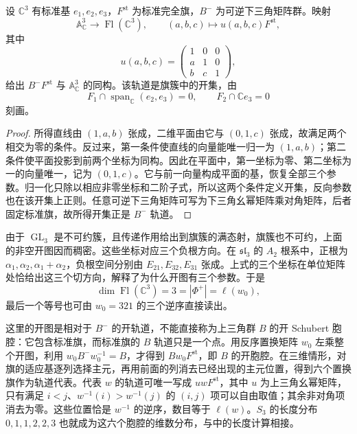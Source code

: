 \begin{proposition}\label{b5:prop:three-dimensional-flag-chart}
	设 \(\mathbb C^3\) 有标准基 \(e_1,e_2,e_3\)，\(F^{\mathrm{st}}\) 为标准完全旗，\(B^-\) 为可逆下三角矩阵群。映射
	\[
		\mathbb A^3_{\mathbb C}\longrightarrow\operatorname{Fl}(\mathbb C^3), \qquad (a,b,c)\longmapsto u(a,b,c)F^{\mathrm{st}},
	\]
	其中
	\[
		u(a,b,c)=\begin{pmatrix}1&0&0\\a&1&0\\b&c&1\end{pmatrix},
	\]
	给出 \(B^-F^{\mathrm{st}}\) 与 \(\mathbb A^3_{\mathbb C}\) 的同构。该轨道是旗簇中的开集，由
	\[
		F_1\cap\operatorname{span}_{\mathbb C}(e_2,e_3)=0, \qquad F_2\cap\mathbb Ce_3=0
	\]
	刻画。
\end{proposition}
\begin{proof}
	所得直线由 \((1,a,b)\) 张成，二维平面由它与 \((0,1,c)\) 张成，故满足两个相交为零的条件。反过来，第一条件使直线的向量能唯一归一为 \((1,a,b)\)；第二条件使平面投影到前两个坐标为同构。因此在平面中，第一坐标为零、第二坐标为一的向量唯一，记为 \((0,1,c)\)。它与前一向量构成平面的基，恢复全部三个参数。归一化只除以相应非零坐标和二阶子式，所以这两个条件定义开集，反向参数也在该开集上正则。任意可逆下三角矩阵可写为下三角幺幂矩阵乘对角矩阵，后者固定标准旗，故所得开集正是 \(B^-\) 轨道。
\end{proof}

由于 \(\operatorname{GL}_3\) 是不可约簇，且传递作用给出到旗簇的满态射，旗簇也不可约，上面的非空开图因而稠密。这些坐标对应三个负根方向。在 \(\mathfrak{sl}_3\) 的 \(A_2\) 根系中，正根为 \(\alpha_1,\alpha_2,\alpha_1+\alpha_2\)，负根空间分别由 \(E_{21},E_{32},E_{31}\) 张成。上式的三个坐标在单位矩阵处恰给出这三个切方向，解释了为什么开图有三个参数。于是
\[
	\dim\operatorname{Fl}(\mathbb C^3)=3=|\Phi^+|=\ell(w_0),
\]
最后一个等号也可由 \(w_0=321\) 的三个逆序直接读出。

\ProseParagraphBreak
这里的开图是相对于 \(B^-\) 的开轨道，不能直接称为上三角群 \(B\) 的开 Schubert 胞腔：它包含标准旗，而标准旗的 \(B\) 轨道只是一个点。用反序置换矩阵 \(w_0\) 左乘整个开图，利用 \(w_0B^-w_0^{-1}=B\)，才得到 \(Bw_0F^{\mathrm{st}}\)，即 \(B\) 的开胞腔。在三维情形，对旗的适应基逐列选择主元，再用前面的列消去已经出现的主元位置，得到六个置换旗作为轨道代表。代表 \(w\) 的轨道可唯一写成 \(uwF^{\mathrm{st}}\)，其中 \(u\) 为上三角幺幂矩阵，只有满足 \(i<j\)、\(w^{-1}(i)>w^{-1}(j)\) 的 \((i,j)\) 项可以自由取值；其余非对角项消去为零。这些位置恰是 \(w^{-1}\) 的逆序，数目等于 \(\ell(w)\)。\(S_3\) 的长度分布 \(0,1,1,2,2,3\) 也就成为这六个胞腔的维数分布，与中的长度计算相接。

